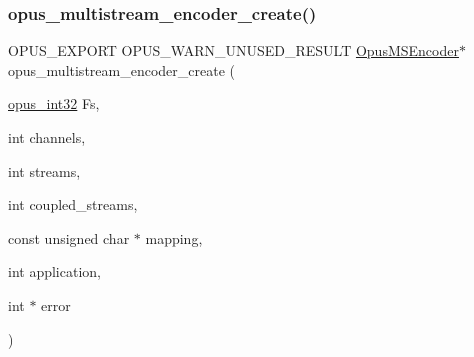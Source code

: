\subsubsection{\texorpdfstring{opus\_multistream\_encoder\_create()}{opus\_multistream\_encoder\_create()}}
{\footnotesize\ttfamily O\+P\+U\+S\+\_\+\+E\+X\+P\+O\+RT O\+P\+U\+S\+\_\+\+W\+A\+R\+N\+\_\+\+U\+N\+U\+S\+E\+D\+\_\+\+R\+E\+S\+U\+LT \mbox{\hyperlink{group__opus__multistream_gae5826674d142fc873ebc1d781c507dd7}{Opus\+M\+S\+Encoder}}$\ast$ opus\+\_\+multistream\+\_\+encoder\+\_\+create (\begin{DoxyParamCaption}\item[{\mbox{\hyperlink{opus__types_8h_aa4d309d6f80b99dbabebc8f98879ab9a}{opus\+\_\+int32}}}]{Fs,  }\item[{int}]{channels,  }\item[{int}]{streams,  }\item[{int}]{coupled\+\_\+streams,  }\item[{const unsigned char $\ast$}]{mapping,  }\item[{int}]{application,  }\item[{int $\ast$}]{error }\end{DoxyParamCaption})}

